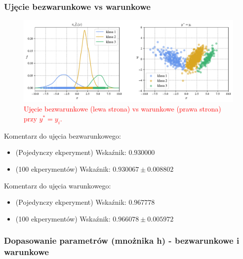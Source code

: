 \documentclass[12pt,a4paper,oneside]{book}
\theoremstyle{definition}
\begin{document}
\subsubsection*{Ujęcie bezwarunkowe vs warunkowe}

\begin{figure}[H]
    \centering
    \includegraphics[scale=0.6]{synthetic_data_classification_kde_and_ckde}
    \vspace{-0.5cm} 
    \caption{\textcolor{red}{Ujęcie bezwarunkowe (lewa strona) vs warunkowe (prawa strona) przy $y^*=y_i$.}}
    \label{fig:synthetic_data_classification_kde_and_ckde}
\end{figure}
Komentarz do ujęcia bezwarunkowego:
\begin{itemize}
\item (Pojedynczy ekperyment) Wskaźnik: $0.930000$
\item (100 ekperymentów) Wskaźnik: $0.930067 \pm 0.008802$
\end{itemize}
Komentarz do ujęcia warunkowego:
\begin{itemize}
\item (Pojedynczy ekperyment) Wskaźnik: $0.967778$
\item (100 ekperymentów) Wskaźnik: $0.966078 \pm 0.005972$
\end{itemize}

\newpage
\subsubsection*{Dopasowanie parametrów (mnożnika h) - bezwarunkowe i warunkowe}
\end{document}
